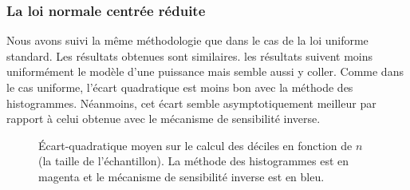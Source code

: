 \subsubsection{La loi normale centrée réduite}


Nous avons suivi la même méthodologie que dans le cas de la loi uniforme standard. Les résultats obtenues sont similaires. les résultats suivent moins uniformément le modèle d'une puissance mais semble aussi y coller. Comme dans le cas uniforme, l'écart quadratique est moins bon avec la méthode des histogrammes. Néanmoins, cet écart semble asymptotiquement meilleur par rapport à celui obtenue avec le mécanisme de sensibilité inverse. 

\begin{figure}[H]
    \centering
    \hfill
    \hfill
    \caption{Écart-quadratique moyen sur le calcul des déciles en fonction de \(n\) (la taille de l'échantillon). La méthode des histogrammes est en {\color{magenta} magenta} et le mécanisme de sensibilité inverse est en {\color{blue} bleu}.}
\end{figure}





